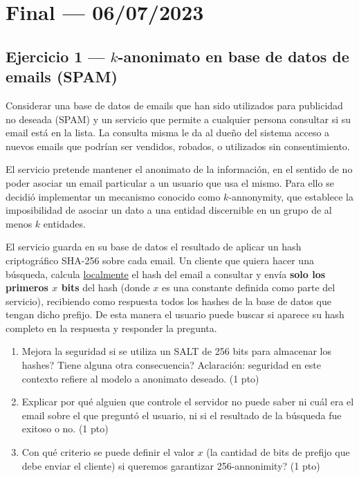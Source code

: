 \section{Final --- 06/07/2023}

\subsection{Ejercicio 1 --- $k$-anonimato en base de datos de emails (SPAM)}

\begin{consigna}
Considerar una base de datos de emails que han sido utilizados para publicidad no
deseada (SPAM) y un servicio que permite a cualquier persona consultar si su email está
en la lista. La consulta misma le da al dueño del sistema acceso a nuevos emails que
podrían ser vendidos, robados, o utilizados sin consentimiento.

El servicio pretende mantener el anonimato de la información, en el sentido de no poder
asociar un email particular a un usuario que usa el mismo. Para ello se decidió
implementar un mecanismo conocido como $k$-annonymity, que establece la imposibilidad de
asociar un dato a una entidad discernible en un grupo de al menos $k$ entidades.

El servicio guarda en su base de datos el resultado de aplicar un hash criptográfico
SHA-256 sobre cada email. Un cliente que quiera hacer una búsqueda, calcula
\underline{localmente} el hash del email a consultar y envía \textbf{solo los primeros
$x$ bits} del hash (donde $x$ es una constante definida como parte del servicio),
recibiendo como respuesta todos los hashes de la base de datos que tengan dicho
prefijo. De esta manera el usuario puede buscar si aparece su hash completo en la
respuesta y responder la pregunta.

\begin{enumerate}
  \item[a)] \textquestiondown{}Mejora la seguridad si se utiliza un SALT de 256 bits para almacenar los
  hashes? \textquestiondown{}Tiene alguna otra consecuencia? Aclaración: seguridad en este contexto
  refiere al modelo a anonimato deseado. (1 pto)
  \item[b)] Explicar por qué alguien que controle el servidor no puede saber ni cuál era
  el email sobre el que preguntó el usuario, ni si el resultado de la búsqueda fue
  exitoso o no. (1 pto)
  \item[c)] \textquestiondown{}Con qué criterio se puede definir el valor $x$ (la cantidad de bits de
  prefijo que debe enviar el cliente) si queremos garantizar 256-annonimity? (1 pto)
\end{enumerate}
\end{consigna}

